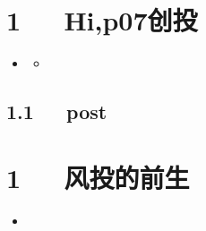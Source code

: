 \documentclass[letterpaper,12pt,english]{sphinxmanual}
\begin{document}
\chapter{1   Hi,p07创投}
\label{\detokenize{p07_u521b_u6295/Hello_uff0cp07_u521b_u6295:hi-p07}}\label{\detokenize{p07_u521b_u6295/Hello_uff0cp07_u521b_u6295::doc}}
\begin{sphinxShadowBox}
\begin{itemize}
\item {} 
\label{\detokenize{p07_u521b_u6295/Hello_uff0cp07_u521b_u6295:id2}}{\hyperref[\detokenize{p07_u521b_u6295/Hello_uff0cp07_u521b_u6295:hi-p07}]{}}
\begin{itemize}
\item {} 
\label{\detokenize{p07_u521b_u6295/Hello_uff0cp07_u521b_u6295:id3}}{\hyperref[\detokenize{p07_u521b_u6295/Hello_uff0cp07_u521b_u6295:post}]{}}

\end{itemize}

\end{itemize}
\end{sphinxShadowBox}


\section{1.1   post}
\label{\detokenize{p07_u521b_u6295/Hello_uff0cp07_u521b_u6295:post}}

\chapter{1   风投的前生}
\label{\detokenize{p07_u521b_u6295/_u98ce_u6295_u7684_u524d_u751f:id1}}\label{\detokenize{p07_u521b_u6295/_u98ce_u6295_u7684_u524d_u751f::doc}}
\begin{sphinxShadowBox}
\begin{itemize}
\item {} 
\label{\detokenize{p07_u521b_u6295/_u98ce_u6295_u7684_u524d_u751f:id3}}{\hyperref[\detokenize{p07_u521b_u6295/_u98ce_u6295_u7684_u524d_u751f:id1}]{}}

\end{itemize}
\end{sphinxShadowBox}
\end{document}

